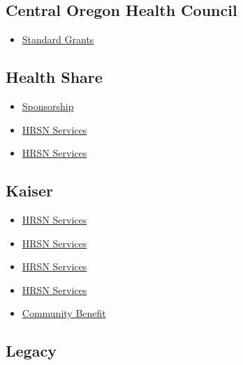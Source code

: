 \documentclass[
  letterpaper,
  DIV=11,
  numbers=noendperiod]{scrreprt}
\providecommand{\tightlist}{%
  \setlength{\itemsep}{0pt}\setlength{\parskip}{0pt}}\usepackage{longtable,booktabs,array}
\begin{document}
\subsection{Central Oregon Health
Council}\label{central-oregon-health-council}

\begin{itemize}
\tightlist
\item
  \href{https://cohealthcouncil.org/standard-grants/}{Standard Grants}
\end{itemize}

\subsection{Health Share}\label{health-share}

\begin{itemize}
\tightlist
\item
  \href{https://www.healthshareoregon.org/about/sponsorship}{Sponsorship}
\item
  \href{https://www.healthshareoregon.org/community-partners/hrsn}{HRSN
  Services}
\item
  \href{https://health-share-or.portals.zenginehq.com/program/community-capacity-building/info}{HRSN
  Services}
\end{itemize}

\subsection{Kaiser}\label{kaiser}

\begin{itemize}
\tightlist
\item
  \href{Laura.J.Howard@kp.org}{HRSN Services}
\item
  \href{https://communityhealth-midatlantic.kaiserpermanente.org/improving-communities/grantmaking/}{HRSN
  Services}
\item
  \href{https://communityhealth-midatlantic.kaiserpermanente.org/wp-content/uploads/2024/02/LOI-Submitter-Help-Document_508.pdf}{HRSN
  Services}
\item
  \href{MedicaidHRSflexfunds@kp.org}{HRSN Services}
\item
  \href{community.benefit@kp.org}{Community Benefit}
\end{itemize}

\subsection{Legacy}\label{legacy}
\end{document}
